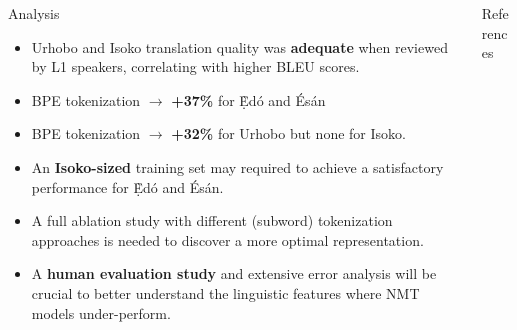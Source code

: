 \documentclass[final]{beamer}
\newlength{\onecolwid}
\newlength{\twocolwid}
\begin{document}
\begin{frame}[t]
\begin{columns}[t]
\begin{column}{\twocolwid}
\begin{columns}[t,totalwidth=\twocolwid]
\begin{column}{\onecolwid}
\begin{block}{Analysis}
\begin{itemize}
\item Urhobo and Isoko translation quality was \textbf{adequate} when reviewed by L1 speakers, correlating with higher BLEU scores.
\item BPE tokenization $\rightarrow$ \textbf{+37\%} for \d{\`E}d{\'o} and {\'E}s{\'a}n
\item BPE tokenization $\rightarrow$ \textbf{+32\%} for Urhobo but none for Isoko.
\item An \textbf{Isoko-sized} training set may required to achieve a satisfactory performance for \d{\`E}d{\'o} and {\'E}s{\'a}n.
\item A full ablation study with different (subword) tokenization approaches is needed to discover a more optimal representation.
\item A \textbf{human evaluation study} and extensive error analysis will be crucial to better understand the linguistic features where NMT models under-perform.
\end{itemize}

\end{block}


\end{column} %

\begin{column}{\onecolwid} %

\begin{block}{References}




\nocite{*} %
\footnotesize{
\vspace{0.75in}}


\end{block}
\end{column}
\end{columns}
\end{column}
\end{columns}
\end{frame}
\end{document}
